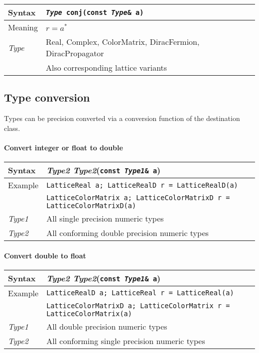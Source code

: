 \documentclass[12pt,letterpaper]{article}
\newcommand{\tLatticeReal}{LatticeReal}
\newcommand{\tLatticeColorMatrix}{LatticeColorMatrix}
\newcommand{\tReal}{Real}
\newcommand{\tComplex}{Complex}
\newcommand{\tColorMatrix}{ColorMatrix}
\newcommand{\tDiracFermion}{DiracFermion}
\newcommand{\tDiracPropagator}{DiracPropagator}
\newcommand{\tLatticeRealD}{LatticeRealD}
\newcommand{\tLatticeColorMatrixD}{LatticeColorMatrixD}
\newcommand{\simLatticeVariants}{Also corresponding lattice variants}
\newcommand{\itt}{\it Type}
\newcommand{\protoUnaryQual}[1]{{\tt {\it Type} #1(const {\it Type}\& a)}}
\begin{document}
\begin{flushleft}
  \begin{tabular}{|l|l|}
  \hline
  Syntax      & \protoUnaryQual{\tt conj}  \\
  \hline
  Meaning     & $r = a^*$ \\
  \hline
  \itt        & \tReal, \tComplex, \tColorMatrix, \tDiracFermion, \tDiracPropagator \\
              & \simLatticeVariants \\
  \hline
  \end{tabular}
\end{flushleft}

\subsection{Type conversion}

Types can be precision converted via a conversion function of the destination
class.

\paragraph{Convert integer or float to double}
\begin{flushleft}
  \begin{tabular}{|l|l|}
  \hline
  Syntax      & {\it Type2 Type2}({\tt const {\it Type1}\& a}) \\
  \hline
  Example     & {\tt \tLatticeReal{} a; \tLatticeRealD{} r = \tLatticeRealD(a)} \\
              & {\tt \tLatticeColorMatrix{} a; \tLatticeColorMatrixD{} r = \tLatticeColorMatrixD(a)} \\
  \hline
  {\it Type1} & All single precision numeric types \\
  {\it Type2} & All conforming double precision numeric types \\
  \hline
  \end{tabular}
\end{flushleft}

\paragraph{Convert double to float}
\begin{flushleft}
  \begin{tabular}{|l|l|}
  \hline
  Syntax      & {\it Type2 Type2}({\tt const {\it Type1}\& a})\\
  \hline
  Example     & {\tt \tLatticeRealD{} a; \tLatticeReal{} r = \tLatticeReal(a)} \\
              & {\tt \tLatticeColorMatrixD{} a; \tLatticeColorMatrix{} r = \tLatticeColorMatrix(a)} \\
  \hline
  {\it Type1} & All double precision numeric types \\
  {\it Type2} & All conforming single precision numeric types \\
  \hline
  \end{tabular}
\end{flushleft}
\end{document}

